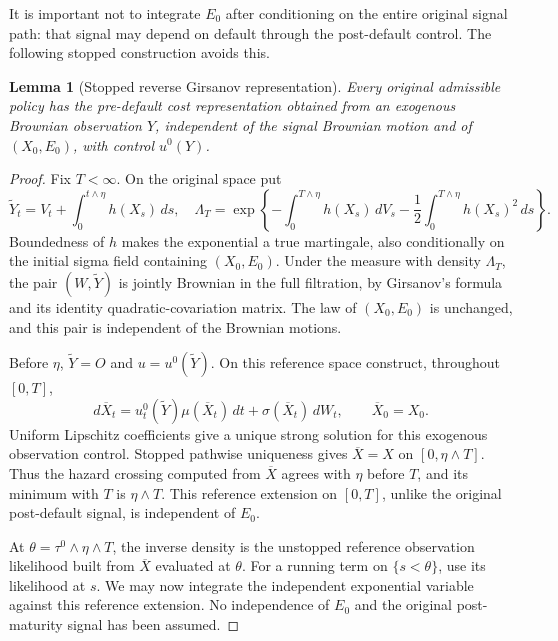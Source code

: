 \documentclass[11pt,a4paper]{article}
\newtheorem{lemma}[theorem]{Lemma}
\theoremstyle{definition}
\theoremstyle{remark}
\begin{document}
It is important not to integrate \(E_0\) after conditioning on the entire
original signal path: that signal may depend on default through the
post-default control. The following stopped construction avoids this.

\begin{lemma}[Stopped reverse Girsanov representation]\label{lem:reverse}
Every original admissible policy has the pre-default cost representation
obtained from an exogenous Brownian observation \(Y\), independent of the
signal Brownian motion and of \((X_0,E_0)\), with control \(u^0(Y)\).
\end{lemma}
\begin{proof}
Fix \(T<\infty\). On the original space put
\[
 \widetilde Y_t=V_t+\int_0^{t\wedge\eta}h(X_s)\,ds,
\quad
 \Lambda_T=\exp\left\{-\int_0^{T\wedge\eta}h(X_s)\,dV_s
              -\frac12\int_0^{T\wedge\eta}h(X_s)^2\,ds\right\}.
\]
Boundedness of \(h\) makes the exponential a true martingale, also
conditionally on the initial sigma field containing \((X_0,E_0)\).
Under the measure with density \(\Lambda_T\), the pair
\((W,\widetilde Y)\) is jointly Brownian in the full filtration, by
Girsanov's formula and its identity quadratic-covariation matrix.
The law of \((X_0,E_0)\) is unchanged, and this pair is independent of
the Brownian motions.

Before \(\eta\), \(\widetilde Y=O\) and \(u=u^0(\widetilde Y)\).
On this reference space construct, throughout \([0,T]\),
\[
 d\overline X_t=u_t^0(\widetilde Y)\mu(\overline X_t)\,dt
                   +\sigma(\overline X_t)\,dW_t,\qquad
 \overline X_0=X_0.
\]
Uniform Lipschitz coefficients give a unique strong solution for this
exogenous observation control. Stopped pathwise uniqueness gives
\(\overline X=X\) on \([0,\eta\wedge T]\). Thus the hazard crossing
computed from \(\overline X\) agrees with \(\eta\) before \(T\), and
its minimum with \(T\) is \(\eta\wedge T\). This reference extension
on \([0,T]\), unlike the original post-default signal, is independent
of \(E_0\).

At \(\theta=\tau^0\wedge\eta\wedge T\), the inverse density is the
unstopped reference observation likelihood built from \(\overline X\)
evaluated at \(\theta\). For a running term on \(\{s<\theta\}\), use
its likelihood at \(s\). We may now integrate the independent exponential
variable against this reference extension. No independence of \(E_0\)
and the original post-maturity signal has been assumed.
\end{proof}
\end{document}
